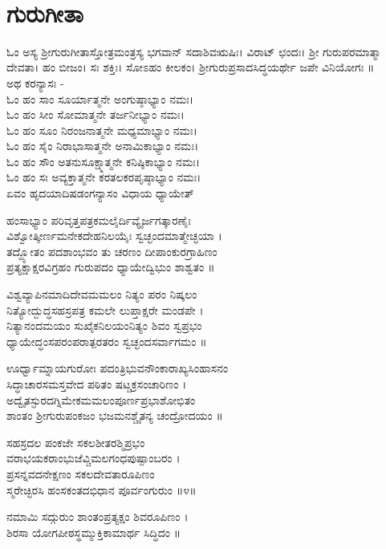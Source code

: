 ‌\chapter*{\center ಗುರುಗೀತಾ}
ಓಂ ಅಸ್ಯ ಶ್ರೀಗುರುಗೀತಾಸ್ತೋತ್ರಮಂತ್ರಸ್ಯ ಭಗವಾನ್ ಸದಾಶಿವಋಷಿಃ। ವಿರಾಟ್ ಛಂದಃ। ಶ್ರೀ ಗುರುಪರಮಾತ್ಮಾ ದೇವತಾ। ಹಂ ಬೀಜಂ। ಸಃ ಶಕ್ತಿಃ। ಸೋಽಹಂ ಕೀಲಕಂ। ಶ್ರೀಗುರುಪ್ರಸಾದಸಿದ್ಧಯರ್ಥೇ ಜಪೇ ವಿನಿಯೋಗಃ ॥\\

ಅಥ ಕರನ್ಯಾಸಃ -\\
ಓಂ ಹಂ ಸಾಂ ಸೂರ್ಯಾತ್ಮನೇ ಅಂಗುಷ್ಠಾಭ್ಯಾಂ ನಮಃ।\\
ಓಂ ಹಂ ಸೀಂ ಸೋಮಾತ್ಮನೇ ತರ್ಜನೀಭ್ಯಾಂ ನಮಃ।\\
ಓಂ ಹಂ ಸೂಂ ನಿರಂಜನಾತ್ಮನೇ ಮಧ್ಯಮಾಭ್ಯಾಂ ನಮಃ।\\
ಓಂ ಹಂ ಸೈಂ ನಿರಾಭಾಸಾತ್ಮನೇ ಅನಾಮಿಕಾಭ್ಯಾಂ ನಮಃ।\\
ಓಂ ಹಂ ಸೌಂ ಅತನುಸೂಕ್ಷ್ಮಾತ್ಮನೇ ಕನಿಷ್ಠಿಕಾಭ್ಯಾಂ ನಮಃ।\\
ಓಂ ಹಂ ಸಃ ಅವ್ಯಕ್ತಾತ್ಮನೇ ಕರತಲಕರಪೃಷ್ಠಾಭ್ಯಾಂ ನಮಃ।\\
ಏವಂ ಹೃದಯಾದಿಷಡಂಗನ್ಯಾಸಂ ವಿಧಾಯ ಧ್ಯಾಯೇತ್\-

ಹಂಸಾಭ್ಯಾಂ ಪರಿವೃತ್ತಪತ್ರಕಮಲೈರ್ದಿವ್ಯೈರ್ಜಗತ್ಕಾರಣೈಃ\\
ವಿಶ್ವೋತ್ಕೀರ್ಣಮನೇಕದೇಹನಿಲಯೈಃ ಸ್ವಚ್ಛಂದಮಾತ್ಮೇಚ್ಛಯಾ ।\\
ತದ್ದ್ಯೋತಂ ಪದಶಾಂಭವಂ ತು ಚರಣಂ ದೀಪಾಂಕುರಗ್ರಾಹಿಣಂ\\
ಪ್ರತ್ಯಕ್ಷಾಕ್ಷರವಿಗ್ರಹಂ ಗುರುಪದಂ ಧ್ಯಾಯೇದ್ವಿಭುಂ ಶಾಶ್ವತಂ ॥

ವಿಶ್ವವ್ಯಾಪಿನಮಾದಿದೇವಮಮಲಂ ನಿತ್ಯಂ ಪರಂ ನಿಷ್ಕಲಂ\\
ನಿತ್ಯೋದ್ಬುದ್ಧಸಹಸ್ರಪತ್ರ ಕಮಲೇ ಲುಪ್ತಾಕ್ಷರೇ ಮಂಡಪೇ ।\\
ನಿತ್ಯಾನಂದಮಯಂ ಸುಖೈಕನಿಲಯಂನಿತ್ಯಂ ಶಿವಂ ಸ್ವಪ್ರಭಂ\\
ಧ್ಯಾಯೇದ್ಧಂಸಪರಂಪರಾತ್ಪರತರಂ ಸ್ವಚ್ಛಂದಸರ್ವಾಗಮಂ ॥

ಊರ್ಧ್ವಾಮ್ನಾಯಗುರೋಃ ಪದಂತ್ರಿಭುವನೌಂಕಾರಾಖ್ಯಸಿಂಹಾಸನಂ\\
ಸಿದ್ಧಾಚಾರಸಮಸ್ತವೇದ ಪಠಿತಂ ಷಟ್ಚಕ್ರಸಂಚಾರಿಣಂ ।\\
ಅದ್ವೈತಸ್ಫುರದಗ್ನಿಮೇಕಮಮಲಂಪೂರ್ಣಪ್ರಭಾಶೋಭಿತಂ\\
ಶಾಂತಂ ಶ್ರೀಗುರುಪಂಕಜಂ ಭಜಮನಶ್ಚೈತನ್ಯ ಚಂದ್ರೋದಯಂ ॥

ಸಹಸ್ರದಲ ಪಂಕಜೇ ಸಕಲಶೀತರಶ್ಮಿಪ್ರಭಂ\\
ವರಾಭಯಕರಾಂಭುಜೆವ್ಚಿಮಲಗಂಧಪುಷ್ಪಾಂಬರಂ ।\\
ಪ್ರಸನ್ನವದನೇಕ್ಷಣಂ ಸಕಲದೇವತಾರೂಪಿಣಂ\\
ಸ್ಮರೇಚ್ಛಿರಸಿ ಹಂಸಕಂತದಭಿಧಾನ ಪೂರ್ವಂಗುರುಂ ॥೪॥

ನಮಾಮಿ ಸದ್ಗುರುಂ ಶಾಂತಂಪ್ರತ್ಯಕ್ಷಂ ಶಿವರೂಪಿಣಂ ।\\
ಶಿರಸಾ ಯೋಗಪೀಠಸ್ಥಮ್ಮುಕ್ತಿಕಾಮಾರ್ಥ ಸಿದ್ಧಿದಂ ॥

